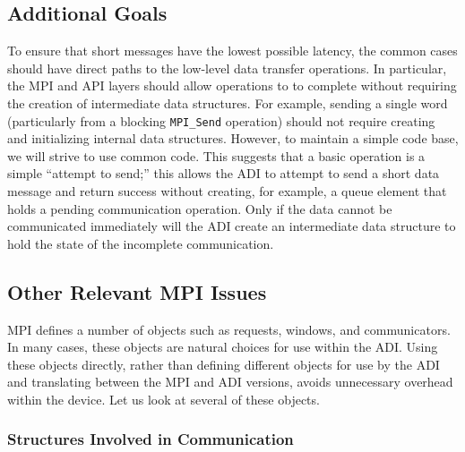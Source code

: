 \documentclass{article}
\def\code#1{\texttt{#1}}
\begin{document}
\subsection{Additional Goals}
To ensure that short messages have the lowest possible latency, the
common cases should have direct paths to the low-level data transfer
operations.  In particular, the MPI and API layers
should allow operations to to complete without requiring the creation
of intermediate data structures.  For example, sending a single word
(particularly from a blocking \code{MPI_Send} operation) should not
require creating and initializing internal data structures.  However,
to maintain a simple code base, we will strive to use common code.
This suggests that a basic operation is a simple ``attempt to
send;'' this allows the ADI to attempt to send a short data message
and return success without creating, for example, a queue element that
holds a pending communication operation.  Only if the data cannot be
communicated immediately will the ADI create an intermediate data
structure to hold the state of the incomplete communication.  

\subsection{Other Relevant MPI Issues}
MPI defines a number of objects such as requests, windows, and
communicators.  In many cases, these objects are natural choices for
use within the ADI.  Using these objects directly, rather than defining
different objects for use by the ADI and translating between the MPI and ADI
versions, avoids unnecessary 
overhead within the device.  Let us look at several of these objects.

\subsubsection{Structures Involved in Communication}
\end{document}

